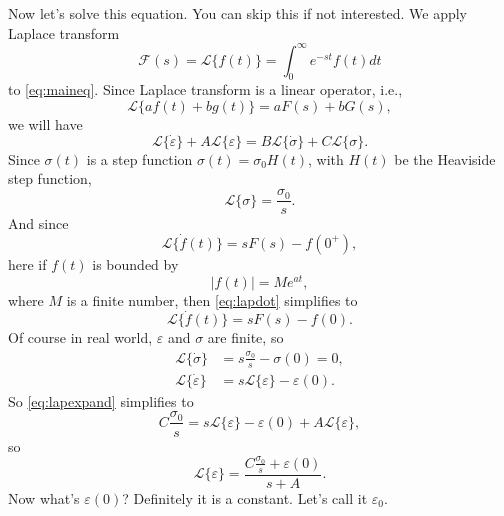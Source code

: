 \documentclass[12pt]{article}
\begin{document}
Now let's solve this equation. You can skip this if not interested.
We apply Laplace transform
\begin{equation}
  \mathcal{F}(s) = \mathcal{L}\{f(t)\} = \int_{0}^{\infty} e^{-s t} f(t) d t
\end{equation}
to \eqref{eq:maineq}. Since Laplace transform is a linear operator, i.e.,
\begin{equation}
  \mathcal{L}\{a f(t)+b g(t)\} = a F(s) + b G(s),
\end{equation}
we will have
\begin{equation}\label{eq:lapexpand}
  \mathcal{L}\{\dot{\varepsilon}\} + A \mathcal{L}\{\varepsilon\} = B \mathcal{L}\{\dot{\sigma}\} + C \mathcal{L}\{\sigma\}.
\end{equation}
Since $\sigma(t)$ is a step function $\sigma(t) = \sigma_0 H(t)$, with $H(t)$ be the Heaviside step function,
\begin{equation}
  \mathcal{L}\{\sigma\} = \frac{ \sigma_0 }{ s }.
\end{equation}
And since
\begin{equation}\label{eq:lapdot}
  \mathcal{L}\{\dot{f}(t)\} = s F(s)-f(0^{+}),
\end{equation}
here if $f(t)$ is bounded by
\begin{equation}
  | f(t) | = M e^{a t},
\end{equation}
where $M$ is a finite number, then \eqref{eq:lapdot} simplifies to
\begin{equation}
  \mathcal{L}\{\dot{f}(t)\} = s F(s) - f(0).
\end{equation}
Of course in real world, $\varepsilon$ and $\sigma$ are finite, so
\begin{align}
  \mathcal{L}\{\dot{\sigma}\}      & = s \frac{ \sigma_0 }{ s } - \sigma(0) = 0,      \\
  \mathcal{L}\{\dot{\varepsilon}\} & = s \mathcal{L}\{\varepsilon\} - \varepsilon(0).
\end{align}
So \eqref{eq:lapexpand} simplifies to
\begin{equation}
  C \frac{ \sigma_0 }{ s } = s \mathcal{L}\{\varepsilon\} - \varepsilon(0) + A \mathcal{L}\{\varepsilon\},
\end{equation}
so
\begin{equation}\label{eq:transformed}
  \mathcal{L}\{\varepsilon\} = \frac{ C \frac{ \sigma_0 }{ s } + \varepsilon(0) }{ s + A }.
\end{equation}
Now what's $\varepsilon(0)$? Definitely it is a constant. Let's call it $\varepsilon_0$.
\end{document}

